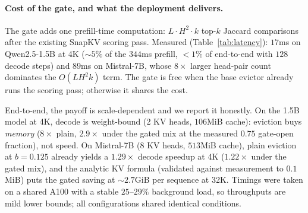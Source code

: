 \documentclass{article}
\begin{document}
\paragraph{Cost of the gate, and what the deployment delivers.}
The gate adds one prefill-time computation: $L \cdot H^2 \cdot k$
top-$k$ Jaccard comparisons after the existing SnapKV scoring pass.
Measured (Table~\ref{tab:latency}): $17$ms on Qwen2.5-1.5B at 4K
($\sim 5\%$ of the $344$ms prefill, $< 1\%$ of end-to-end with $128$
decode steps) and $89$ms on Mistral-7B, whose $8\times$ larger
head-pair count dominates the $O(L H^2 k)$ term. The gate is free when
the base evictor already runs the scoring pass; otherwise it shares
the cost.

End-to-end, the payoff is scale-dependent and we report it honestly.
On the 1.5B model at 4K, decode is weight-bound (2 KV heads, $106$MiB
cache): eviction buys \emph{memory} ($8\times$ plain, $2.9\times$
under the gated mix at the measured $0.75$ gate-open fraction), not
speed. On Mistral-7B (8 KV heads, $513$MiB cache), plain eviction at
$b = 0.125$ already yields a $1.29\times$ decode speedup at 4K
($1.22\times$ under the gated mix), and the analytic KV formula
(validated against measurement to $0.1$MiB) puts the gated saving at
$\sim 2.7$GiB per sequence at 32K. Timings were taken on a shared
A100 with a stable $25$--$29\%$ background load, so throughputs are
mild lower bounds; all configurations shared identical conditions.
\end{document}
